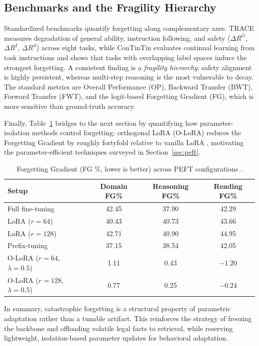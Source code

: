 \subsection{Benchmarks and the Fragility Hierarchy}
Standardized benchmarks quantify forgetting along complementary axes. TRACE \parencite{wang2023tracecomprehensivebenchmarkcontinual} measures degradation of general ability, instruction following, and safety ($\Delta R^{G}$, $\Delta R^{I}$, $\Delta R^{S}$) across eight tasks, while ConTinTin \parencite{yin-etal-2022-contintin} evaluates continual learning from task instructions and shows that tasks with overlapping label spaces induce the strongest forgetting. A consistent finding is a \emph{fragility hierarchy}: safety alignment is highly persistent, whereas multi-step reasoning is the most vulnerable to decay. The standard metrics are Overall Performance (OP), Backward Transfer (BWT), Forward Transfer (FWT), and the logit-based Forgetting Gradient (FG), which is more sensitive than ground-truth accuracy.

Finally, Table~\ref{tab:fg_lora} bridges to the next section by quantifying how parameter-isolation methods control forgetting: orthogonal LoRA (O-LoRA) reduces the Forgetting Gradient by roughly fortyfold relative to vanilla LoRA \parencite{repec:axf:aidtaa:v:3:y:2026:i:1:p:52-61}, motivating the parameter-efficient techniques surveyed in Section~\ref{sec:peft}.

\begin{table}[H]
\centering
\small
\caption{Forgetting Gradient (FG \%, lower is better) across PEFT configurations \parencite{repec:axf:aidtaa:v:3:y:2026:i:1:p:52-61}.}
\label{tab:fg_lora}
\begin{tabularx}{\textwidth}{X c c c}
\hline
\textbf{Setup} & \textbf{Domain FG\%} & \textbf{Reasoning FG\%} & \textbf{Reading FG\%} \\
\hline
Full fine-tuning & 42.45 & 37.90 & 42.29 \\
LoRA ($r{=}64$) & 40.43 & 40.73 & 43.66 \\
LoRA ($r{=}128$) & 42.71 & 40.90 & 44.95 \\
Prefix-tuning & 37.15 & 38.54 & 42.05 \\
O-LoRA ($r{=}64$, $\lambda{=}0.5$) & 1.11 & 0.43 & $-1.20$ \\
O-LoRA ($r{=}128$, $\lambda{=}0.5$) & 0.77 & 0.25 & $-0.24$ \\
\hline
\end{tabularx}
\end{table}

In summary, catastrophic forgetting is a structural property of parametric adaptation rather than a tunable artifact. This reinforces the strategy of freezing the backbone and offloading volatile legal facts to retrieval, while reserving lightweight, isolation-based parameter updates for behavioral adaptation.
